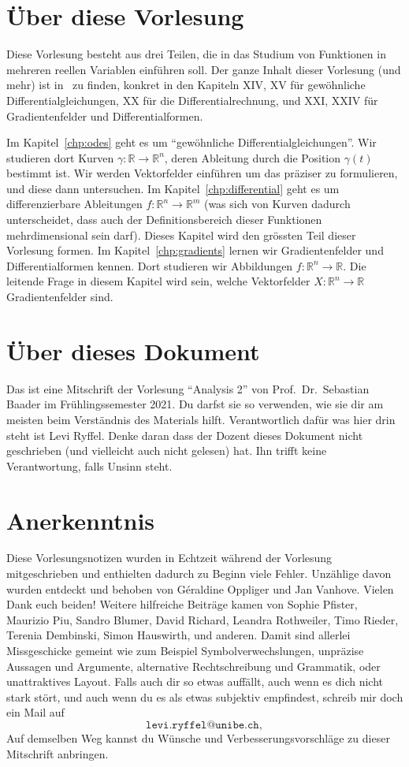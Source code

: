 \documentclass[../main.tex]{subfiles}
\begin{document}
\section*{Über diese Vorlesung}
Diese Vorlesung besteht aus drei Teilen,
die in das Studium von Funktionen
in mehreren reellen Variablen
einführen soll. Der ganze Inhalt
dieser Vorlesung (und mehr) ist in~\cite{heuser}
zu finden,
konkret in den Kapiteln XIV, XV für
gewöhnliche Differentialgleichungen,
XX für die Differentialrechnung,
und XXI, XXIV für Gradientenfelder
und Differentialformen.

Im Kapitel~\ref{chp:odes} geht es um
``gewöhnliche Differentialgleichungen''.
Wir studieren dort Kurven
$\gamma \colon \mathbb{R} \to \mathbb{R}^n$,
deren Ableitung durch die
Position $\gamma(t)$ bestimmt ist.
Wir werden Vektorfelder einführen
um das präziser zu formulieren,
und diese dann untersuchen.
Im Kapitel~\ref{chp:differential}
geht es um differenzierbare
Ableitungen
$f \colon \mathbb{R}^n \to \mathbb{R}^m$
(was sich von Kurven dadurch unterscheidet,
dass auch der Definitionsbereich
dieser Funktionen mehrdimensional sein darf).
Dieses Kapitel wird den grössten Teil
dieser Vorlesung formen.
Im Kapitel~\ref{chp:gradients} lernen
wir Gradientenfelder und Differentialformen
kennen. Dort studieren wir
Abbildungen $f \colon\mathbb{R}^n \to \mathbb{R}$.
Die leitende Frage in diesem Kapitel wird sein,
welche Vektorfelder $X \colon \mathbb{R}^n
\to \mathbb{R}$ Gradientenfelder sind.




\section*{Über dieses Dokument}
Das ist eine Mitschrift
der Vorlesung ``Analysis 2''
von Prof.\ Dr.\ Sebastian Baader
im Frühlingssemester 2021.
Du darfst sie so verwenden,
wie sie dir am meisten
beim Verständnis des Materials
hilft.
Verantwortlich dafür was
hier drin steht ist Levi Ryffel.
Denke daran dass der Dozent dieses Dokument
nicht geschrieben (und vielleicht auch nicht gelesen) hat.
Ihn trifft keine Verantwortung, falls
Unsinn steht.

\section*{Anerkenntnis}
Diese Vorlesungsnotizen wurden in Echtzeit während der Vorlesung mitgeschrieben
und enthielten dadurch zu Beginn viele Fehler.
Unzählige davon wurden entdeckt und behoben
von Géraldine Oppliger und Jan Vanhove.
Vielen Dank euch beiden! Weitere hilfreiche Beiträge kamen
von Sophie Pfister, Maurizio Piu, Sandro Blumer, David Richard, Leandra Rothweiler,
Timo Rieder, Terenia Dembinski, Simon Hauswirth, und anderen.
Damit sind allerlei Missgeschicke
gemeint wie zum Beispiel
Symbolverwechslungen, unpräzise Aussagen und Argumente,
alternative Rechtschreibung und Grammatik,
oder unattraktives Layout.
Falls auch dir so etwas auffällt,
auch wenn es dich nicht stark stört,
und auch wenn du es
als etwas subjektiv empfindest,
schreib mir doch ein Mail auf
\[
\texttt{levi.ryffel@unibe.ch},
\]
Auf demselben Weg kannst du Wünsche
und Verbesserungsvorschläge
zu dieser Mitschrift
anbringen.
\end{document}
